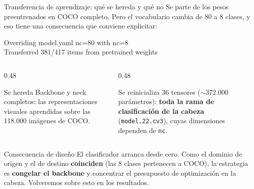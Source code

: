 \documentclass[aspectratio=169,11pt]{beamer}
\begin{document}
\begin{frame}{Transferencia de aprendizaje: qué se hereda y qué no}
  Se parte de los pesos preentrenados en COCO completo. Pero el vocabulario cambia de 80 a
  8 clases, y eso tiene una consecuencia que conviene explicitar:

  \vspace{0.5em}
  {\footnotesize\ttfamily\color{gris}
  Overriding model.yaml nc=80 with nc=8\\
  \color{rojo}Transferred 381/417 items from pretrained weights}

  \vspace{0.8em}
  \begin{columns}[T]
    \begin{column}{0.48\textwidth}
      \begin{exampleblock}{Se hereda}
        \footnotesize
        Backbone y neck completos: las representaciones visuales aprendidas sobre las
        118.000 imágenes de COCO.
      \end{exampleblock}
    \end{column}
    \begin{column}{0.48\textwidth}
      \begin{alertblock}{Se reinicializa}
        \footnotesize
        36 tensores ($\sim$372.000 parámetros): \textbf{toda la rama de clasificación de
        la cabeza} (\texttt{model.22.cv3}), cuyas dimensiones dependen de \texttt{nc}.
      \end{alertblock}
    \end{column}
  \end{columns}

  \vspace{0.8em}
  \begin{block}{Consecuencia de diseño}
    \footnotesize
    El clasificador arranca desde cero. Como el dominio de origen y el de destino
    \textbf{coinciden} (las 8 clases pertenecen a COCO), la estrategia es
    \textbf{congelar el backbone} y concentrar el presupuesto de optimización en la
    cabeza. Volveremos sobre esto en los resultados.
  \end{block}
\end{frame}
\end{document}
